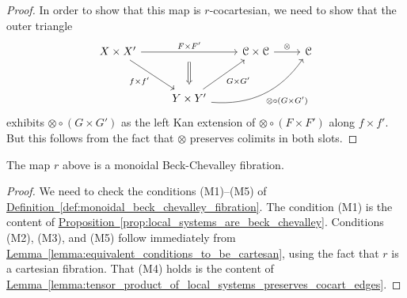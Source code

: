 \documentclass[main.tex]{subfiles}
\begin{document}
\begin{proof}
  In order to show that this map is $r$-cocartesian, we need to show that the outer triangle
  \begin{equation*}
    \begin{tikzcd}[row sep=large]
      X \times X'
      \arrow[rr, "F \times F'", ""{below, name=M}]
      \arrow[dr, swap, "f \times f'"]
      && \category{C} \times \category{C}
      \arrow[r, "\otimes"]
      & \category{C}
      \\
      & Y \times Y'
      \arrow[urr, bend right, swap, "\otimes \circ (G \times G')"]
      \arrow[ur, swap, "G \times G'"]
      \arrow[from=M, Rightarrow, shorten=1ex]
    \end{tikzcd}
  \end{equation*}
  exhibits $\otimes \circ (G \times G')$ as the left Kan extension of $\otimes \circ (F \times F')$ along $f \times f'$. But this follows from the fact that $\otimes$ preserves colimits in both slots.
\end{proof}

\begin{proposition}
  The map $r$ above is a monoidal Beck-Chevalley fibration.
\end{proposition}
\begin{proof}
  We need to check the conditions (M1)--(M5) of \hyperref[def:monoidal_beck_chevalley_fibration]{Definition~\ref*{def:monoidal_beck_chevalley_fibration}}. The condition (M1) is the content of \hyperref[prop:local_systems_are_beck_chevalley]{Proposition~\ref*{prop:local_systems_are_beck_chevalley}}. Conditions (M2), (M3), and (M5) follow immediately from \hyperref[lemma:equivalent_conditions_to_be_cartesan]{Lemma~\ref*{lemma:equivalent_conditions_to_be_cartesan}}, using the fact that $r$ is a cartesian fibration. That (M4) holds is the content of \hyperref[lemma:tensor_product_of_local_systems_preserves_cocart_edges]{Lemma~\ref*{lemma:tensor_product_of_local_systems_preserves_cocart_edges}}.
\end{proof}
\end{document}
